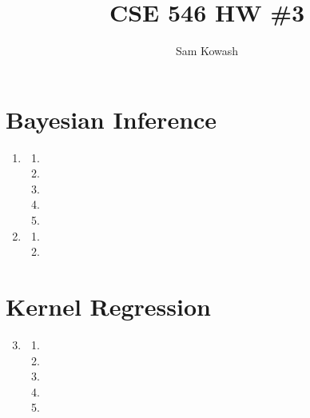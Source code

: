 \documentclass[11pt,letterpaper]{article}
\author{Sam Kowash}
\title{CSE 546 HW \#3}
\theoremstyle{definition}
\theoremstyle{plain}
\numberwithin{equation}{section}
\numberwithin{figure}{section}
\begin{document}
\maketitle

\section{Bayesian Inference}
\begin{enumerate}
	\item \begin{enumerate}
		\item
		\item 
		\item 
		\item 
		\item 
	\end{enumerate}






	\item \begin{enumerate}
		\item
		\item 
	\end{enumerate}
\end{enumerate}
































\section{Kernel Regression}
\begin{enumerate}
\setcounter{enumi}{2}
	\item \begin{enumerate}
		\item
		\item 
		\item 
		\item 
		\item 
	\end{enumerate}
\end{enumerate}
\end{document}
